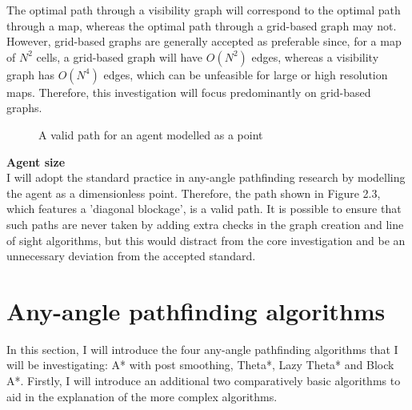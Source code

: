 \documentclass[12pt,notitlepage]{report}
\begin{document}
\noindent
The optimal path through a visibility graph will correspond to the optimal path through a map, whereas the optimal path through a grid-based graph may not. However, grid-based graphs are generally accepted as preferable since, for a map of {$N^{2}$} cells, a grid-based graph will have {$O(N^{2})$} edges, whereas a visibility graph has {$O(N^{4})$} edges, which can be unfeasible for large or high resolution maps. Therefore, this investigation will focus predominantly on grid-based graphs.\\

\begin{figure}
    \centering
  \caption{A valid path for an agent modelled as a point}
\end{figure}


\noindent
{\bfseries Agent size}\\

\noindent
I will adopt the standard practice in any-angle pathfinding research by modelling the agent as a dimensionless point. Therefore, the path shown in Figure 2.3, which features a 'diagonal blockage', is a valid path. It is possible to ensure that such paths are never taken by adding extra checks in the graph creation and line of sight algorithms, but this would distract from the core investigation and be an unnecessary deviation from the accepted standard.

\section{Any-angle pathfinding algorithms}

In this section, I will introduce the four any-angle pathfinding algorithms that I will be investigating: A* with post smoothing, Theta*, Lazy Theta* and Block A*. Firstly, I will introduce an additional two comparatively basic algorithms to aid in the explanation of the more complex algorithms.
\end{document}
